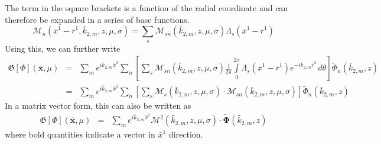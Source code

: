 The term in the square brackets is a function of the radial coordinate
and can therefore be expanded in a series of base functions.
\begin{displaymath}
  \mathcal{M}_n(\bar{x}^1-\bar{r}^1,\bar{k}_{2,m},z,\mu,\sigma)
  =\sum_s \mathcal{M}_{sn}(\bar{k}_{2,m},z,\mu,\sigma)\Lambda_s(\bar{x}^1-\bar{r}^1)
\end{displaymath}
Using this, we can further write
\begin{eqnarray*}
  \mathfrak{G}[\Phi](\bar{\mathbf{x}},\mu)
  &=&\sum_m e^{i\bar{k}_{2,m}\bar{x}^2} \sum_n \left[
    \sum_s \mathcal{M}_{sn}(\bar{k}_{2,m},z,\mu,\sigma)
    \frac{1}{2\pi}\int\limits_0^{2\pi}\Lambda_s(\bar{x}^1-\bar{r}^1)
    e^{-i\bar{k}_{2,m}\bar{r}^2}\,d\theta
  \right]\tilde{\Phi}_n(\bar{k}_{2,m},z)\\
  &=&\sum_m e^{i\bar{k}_{2,m}\bar{x}^2} \sum_n \left[
    \sum_s \mathcal{M}_s(\bar{k}_{2,m},z,\mu,\sigma)\cdot\mathcal{M}_{sn}(\bar{k}_{2,m},z,\mu,\sigma)
  \right]\tilde{\Phi}_n(\bar{k}_{2,m},z)
\end{eqnarray*}
In a matrix vector form, this can also be written as
\begin{eqnarray*}
  \pmb{\mathfrak{G}}[\Phi](\bar{\mathbf{x}},\mu)
  &=&\sum_m e^{i\bar{k}_{2,m}\bar{x}^2} \mathcal{M}^2(\bar{k}_{2,m},z,\mu,\sigma)\cdot\tilde{\mathbf{\Phi}}(\bar{k}_{2,m},z)
\end{eqnarray*}
where bold quantities indicate a vector in $\bar{x}^1$ direction.

